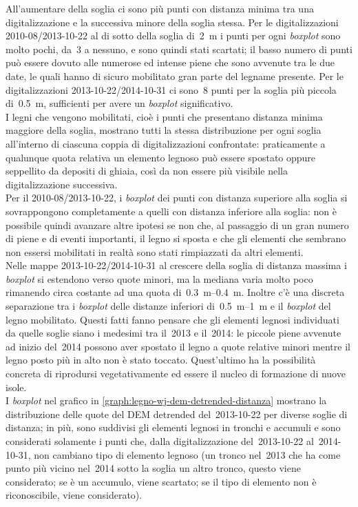 All'aumentare della soglia ci sono più punti con distanza minima tra una digitalizzazione e la successiva minore della soglia stessa.
Per le digitalizzazioni 2010-08/2013-10-22 al di sotto della soglia di~\SI{2}{\m} i punti per ogni \emph{boxplot} sono molto pochi, da~3 a nessuno, e sono quindi stati scartati; il basso numero di punti può essere dovuto alle numerose ed intense piene che sono avvenute tra le due date, le quali hanno di sicuro mobilitato gran parte del legname presente.
Per le digitalizzazioni 2013-10-22/2014-10-31 ci sono~8 punti per la soglia più piccola di~\SI{0.5}{\m}, sufficienti per avere un \emph{boxplot} significativo.
\\
I legni che vengono mobilitati, cioè i punti che presentano distanza minima maggiore della soglia, mostrano tutti la stessa distribuzione per ogni soglia all'interno di ciascuna coppia di digitalizzazioni confrontate: praticamente a qualunque quota relativa un elemento legnoso può essere spostato oppure seppellito da depositi di ghiaia, così da non essere più visibile nella digitalizzazione successiva.
\\
Per il 2010-08/2013-10-22, i \emph{boxplot} dei punti con distanza superiore alla soglia si sovrappongono completamente a quelli con distanza inferiore alla soglia: non è possibile quindi avanzare altre ipotesi se non che, al passaggio di un gran numero di piene e di eventi importanti, il legno si sposta e che gli elementi che sembrano non essersi mobilitati in realtà sono stati rimpiazzati da altri elementi.
\\
Nelle mappe 2013-10-22/2014-10-31 al crescere della soglia di distanza massima i \emph{boxplot} si estendono verso quote minori, ma la mediana varia molto poco rimanendo circa costante ad una quota di~\SIrange[range-phrase = {-}, range-units = single]{0.3}{0.4}{\m}.
Inoltre c'è una discreta separazione tra i \emph{boxplot} delle distanze inferiori di~\SIrange[range-phrase = { e }]{0.5}{1}{\m} e il \emph{boxplot} del legno mobilitato.
Questi fatti fanno pensare che gli elementi legnosi individuati da quelle soglie siano i medesimi tra il~2013 e il~2014: le piccole piene avvenute ad inizio del~2014 possono aver spostato il legno a quote relative minori mentre il legno posto più in alto non è stato toccato.
Quest'ultimo ha la possibilità concreta di riprodursi vegetativamente ed essere il nucleo di formazione di nuove isole.
\\
I \emph{boxplot} nel grafico in \cref{graph:legno-wj-dem-detrended-distanza} mostrano la distribuzione delle quote del DEM detrended del~2013-10-22 per diverse soglie di distanza; in più, sono suddivisi gli elementi legnosi in tronchi e accumuli e sono considerati solamente i punti che, dalla digitalizzazione del~2013-10-22 al~2014-10-31, non cambiano tipo di elemento legnoso (un tronco nel~2013 che ha come punto più vicino nel~2014 sotto la soglia un altro tronco, questo viene considerato; se è un accumulo, viene scartato; se il tipo di elemento non è riconoscibile, viene considerato).

